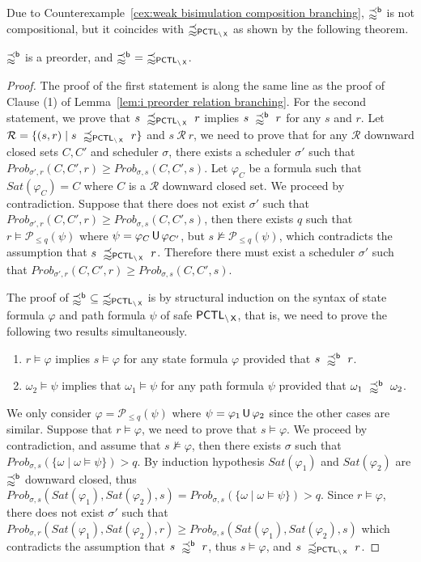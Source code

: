 \documentclass{LMCS}
\def\phi{\varphi}
\DeclareMathOperator{\U}{\text{\sf U}}
\DeclareMathOperator{\X}{\text{\sf X}}
\newcommand{\PCTL}{{\sf PCTL}}
\newcommand{\MC}[1]{\mathcal{#1}}
\newcommand{\SEPCTLWN}{\precapprox_{\PCTL_{\backslash\X}}}
\newcommand{\WBSi}{\precapprox^{{\sf b}}}
\newcommand{\MEASURE}{\mathit{Prob}}
\begin{document}
\noindent Due to Counterexample~\ref{cex:weak bisimulation composition
  branching}, $\WBSi$ is not compositional, but it coincides with
$\SEPCTLWN$ as shown by the following theorem.
\begin{thm}\label{thm:weak simulation and PCTL branching}
$\WBSi$ is a preorder, and $\WBSi~=~\SEPCTLWN$.
\end{thm}
\begin{proof}
The proof of the first statement is along the
  same line as the proof of Clause (1) of Lemma~\ref{lem:i preorder relation branching}.
For the second statement, 
 we prove that $s~\SEPCTLWN~r$ implies $s~\WBSi~r$ for
  any $s$ and $r$. Let $\MC{R}=\{(s,r)\mid
  s~\SEPCTLWN~r\}$ and $s~\MC{R}~r$, we need to
  prove that for any $\MC{R}$ downward closed sets $C,C'$ and
  scheduler $\sigma$, there exists a scheduler $\sigma'$ such that
  $\MEASURE_{\sigma',r}(C,C',r)\geq\MEASURE_{\sigma,s}(C,C',s)$. Let $\phi_C$ be a formula such that
  $\mathit{Sat}(\phi_C)=C$ where $C$ is a $\MC{R}$ downward closed
  set. We proceed by contradiction. Suppose that there does not exist
  $\sigma'$ such that
  $\MEASURE_{\sigma',r}(C,C',r)\geq\MEASURE_{\sigma,s}(C,C',s)$, then
  there exists $q$ such that $r\models\MC{P}_{\leq q}(\psi)$ where
  $\psi=\phi_C\U\phi_{C'}$, but $s\not\models\MC{P}_{\leq q}(\psi)$,
  which contradicts the assumption that $s~\SEPCTLWN~r$. Therefore
  there must exist a scheduler $\sigma'$ such that
  $\MEASURE_{\sigma',r}(C,C',r)\geq\MEASURE_{\sigma,s}(C,C',s)$.


  The proof of $\WBSi~\subseteq~\SEPCTLWN$ is by structural induction
  on the syntax of state formula $\phi$ and path formula $\psi$ of
  safe $\PCTL_{\backslash\X}$, that is, we need to prove the following
  two results simultaneously.
\begin{enumerate}[(1)]
\item $r\models\phi$ implies $s\models\phi$ for any state formula $\phi$ provided that $s~\WBSi~r$.
\item $\omega_2\models\psi$ implies that $\omega_1\models\psi$ for any path formula $\psi$ provided that $\omega_1~\WBSi~\omega_2$.
\end{enumerate}
We only consider $\phi=\MC{P}_{\leq q}(\psi)$ where
$\psi=\phi_1\U\phi_2$ since the other cases are similar. Suppose that
$r\models\phi$, we need to prove that $s\models\phi$. We proceed by
contradiction, and assume that $s\not\models\phi$, then there exists
$\sigma$ such that
$\MEASURE_{\sigma,s}(\{\omega\mid\omega\models\psi\})>q$. By induction hypothesis
$\mathit{Sat}(\phi_1)$ and $\mathit{Sat}(\phi_2)$ are $\WBSi$ downward
closed, thus
$\MEASURE_{\sigma,s}(\mathit{Sat}(\phi_1),\mathit{Sat}(\phi_2),s)=\MEASURE_{\sigma,s}(\{\omega\mid\omega\models\psi\})>q$. Since
$r\models\phi$, there does not exist $\sigma'$ such that
$\MEASURE_{\sigma,r}(\mathit{Sat}(\phi_1),\mathit{Sat}(\phi_2),r)\geq
\MEASURE_{\sigma,s}(\mathit{Sat}(\phi_1),\mathit{Sat}(\phi_2),s)$
which contradicts the assumption that $s~\WBSi~r$, thus
$s\models\phi$, and $s~\SEPCTLWN~r$.
\end{proof}
\end{document}
